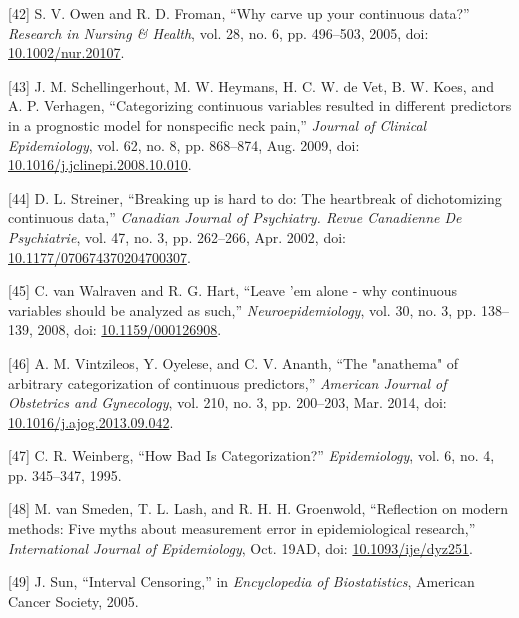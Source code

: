 \documentclass[
]{article}
\newenvironment{cslreferences}%
  {}%
  {\par}
\begin{document}
\begin{cslreferences}
\leavevmode\hypertarget{ref-owen_why_2005}{}%
{[}42{]} S. V. Owen and R. D. Froman, ``Why carve up your continuous data?'' \emph{Research in Nursing \& Health}, vol. 28, no. 6, pp. 496--503, 2005, doi: \href{https://doi.org/10.1002/nur.20107}{10.1002/nur.20107}.

\leavevmode\hypertarget{ref-schellingerhout_categorizing_2009}{}%
{[}43{]} J. M. Schellingerhout, M. W. Heymans, H. C. W. de Vet, B. W. Koes, and A. P. Verhagen, ``Categorizing continuous variables resulted in different predictors in a prognostic model for nonspecific neck pain,'' \emph{Journal of Clinical Epidemiology}, vol. 62, no. 8, pp. 868--874, Aug. 2009, doi: \href{https://doi.org/10.1016/j.jclinepi.2008.10.010}{10.1016/j.jclinepi.2008.10.010}.

\leavevmode\hypertarget{ref-streiner_breaking_2002}{}%
{[}44{]} D. L. Streiner, ``Breaking up is hard to do: The heartbreak of dichotomizing continuous data,'' \emph{Canadian Journal of Psychiatry. Revue Canadienne De Psychiatrie}, vol. 47, no. 3, pp. 262--266, Apr. 2002, doi: \href{https://doi.org/10.1177/070674370204700307}{10.1177/070674370204700307}.

\leavevmode\hypertarget{ref-van_walraven_leave_2008}{}%
{[}45{]} C. van Walraven and R. G. Hart, ``Leave 'em alone - why continuous variables should be analyzed as such,'' \emph{Neuroepidemiology}, vol. 30, no. 3, pp. 138--139, 2008, doi: \href{https://doi.org/10.1159/000126908}{10.1159/000126908}.

\leavevmode\hypertarget{ref-vintzileos_anathema_2014}{}%
{[}46{]} A. M. Vintzileos, Y. Oyelese, and C. V. Ananth, ``The "anathema" of arbitrary categorization of continuous predictors,'' \emph{American Journal of Obstetrics and Gynecology}, vol. 210, no. 3, pp. 200--203, Mar. 2014, doi: \href{https://doi.org/10.1016/j.ajog.2013.09.042}{10.1016/j.ajog.2013.09.042}.

\leavevmode\hypertarget{ref-weinberg_how_1995}{}%
{[}47{]} C. R. Weinberg, ``How Bad Is Categorization?'' \emph{Epidemiology}, vol. 6, no. 4, pp. 345--347, 1995.

\leavevmode\hypertarget{ref-van_smeden_reflection_2019}{}%
{[}48{]} M. van Smeden, T. L. Lash, and R. H. H. Groenwold, ``Reflection on modern methods: Five myths about measurement error in epidemiological research,'' \emph{International Journal of Epidemiology}, Oct. 19AD, doi: \href{https://doi.org/10.1093/ije/dyz251}{10.1093/ije/dyz251}.

\leavevmode\hypertarget{ref-sun_interval_2005}{}%
{[}49{]} J. Sun, ``Interval Censoring,'' in \emph{Encyclopedia of Biostatistics}, American Cancer Society, 2005.


\end{cslreferences}
\end{document}
